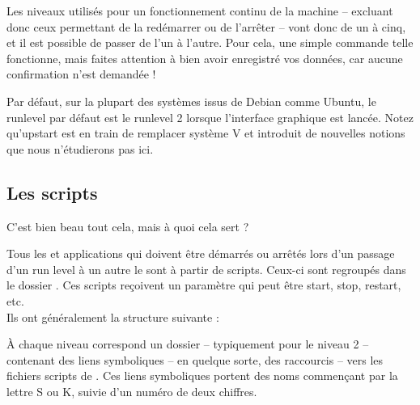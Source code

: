 Les niveaux utilisés pour un fonctionnement continu de la machine -- excluant donc ceux permettant de la redémarrer ou de l'arrêter -- vont donc de un à cinq, et il est possible de passer de l'un à l'autre. Pour cela, une simple commande telle  fonctionne, mais faites attention à bien avoir enregistré vos données, car aucune confirmation n'est demandée !\par
Par défaut, sur la plupart des systèmes issus de Debian comme Ubuntu, le runlevel par défaut est le runlevel 2 lorsque l'interface graphique est lancée. Notez qu'upstart est en train de remplacer système V et introduit de nouvelles notions que nous n'étudierons pas ici.
\subsection{Les scripts}
C'est bien beau tout cela, mais à quoi cela sert ?\par
Tous les  et applications qui doivent être démarrés ou arrêtés lors d'un passage d'un run level à un autre le sont à partir de scripts. Ceux-ci sont regroupés dans le dossier . Ces scripts reçoivent un paramètre qui peut être start, stop, restart, etc.\\
Ils ont généralement la structure suivante :\par
{}
À chaque niveau correspond un dossier -- typiquement  pour le niveau 2 -- contenant des liens symboliques -- en quelque sorte, des raccourcis -- vers les fichiers scripts de . Ces liens symboliques portent des noms commençant par la lettre S ou K, suivie d'un numéro de deux chiffres.\par
